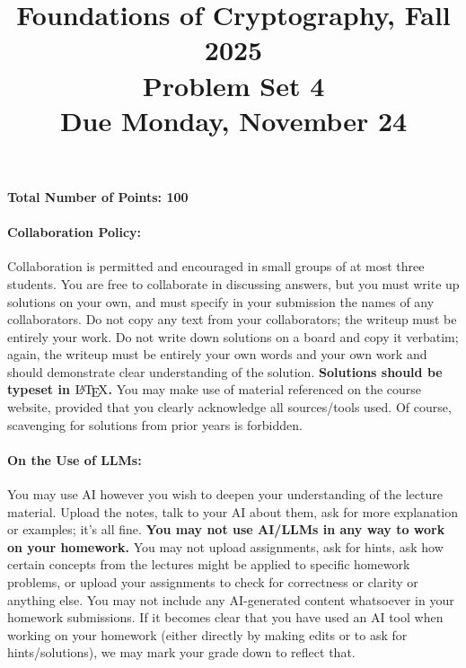 \documentclass{article}
\title{Foundations of Cryptography, Fall 2025 \\ Problem Set 4 \\ Due Monday, November 24}
\date{}
\author{}
\begin{document}
\maketitle

\paragraph{Total Number of Points: 100}

\paragraph{Collaboration Policy:} Collaboration is permitted and encouraged in small groups of at most three students. You are free to collaborate in discussing answers, but you must write up solutions on your own, and must specify in your submission the names of any collaborators. Do not copy any text from your collaborators; the writeup must be entirely your work. Do not write down solutions on a board and copy it verbatim; again, the writeup must be entirely your own words and your own work and should demonstrate clear understanding of the solution. \textbf{Solutions should be typeset in $\text{\LaTeX}$.} You may make use of material referenced on the course website, provided that you clearly acknowledge all sources/tools used. Of course, scavenging for solutions from prior years is forbidden.

\paragraph{On the Use of LLMs:} You may use AI however you wish to deepen your understanding of the lecture material. Upload the notes, talk to your AI about them, ask for more explanation or examples; it's all fine. \textbf{You may not use AI/LLMs in any way to work on your homework.} You may not upload assignments, ask for hints, ask how certain concepts from the lectures might be applied to specific homework problems, or upload your assignments to check for correctness or clarity or anything else. You may not include any AI-generated content whatsoever in your homework submissions. If it becomes clear that you have used an AI tool when working on your homework (either directly by making edits or to ask for hints/solutions), we may mark your grade down to reflect that.

\def\Eval{\mathsf{Eval}}
\newpage
\end{document}
